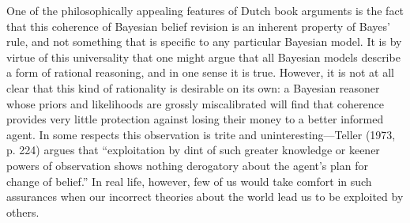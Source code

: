 One of the philosophically appealing features of Dutch book arguments is the fact that this coherence of Bayesian belief revision is an inherent property of Bayes' rule, and not something that is specific to any particular Bayesian model. It is by virtue of this universality that one might argue that all Bayesian models describe a form of rational reasoning, and in one sense it is true. However, it is not at all clear that this kind of rationality is desirable on its own: a Bayesian reasoner whose priors and likelihoods are grossly miscalibrated will find that coherence provides very little protection against losing their money to a better informed agent. In some respects this observation is trite and uninteresting---Teller (1973, p. 224) argues that ``exploitation by dint of such greater knowledge or keener powers of observation shows nothing derogatory about the agent's plan for change of belief.'' In real life, however, few of us would take comfort in such assurances when our incorrect theories about the world lead us to be exploited by others. 

